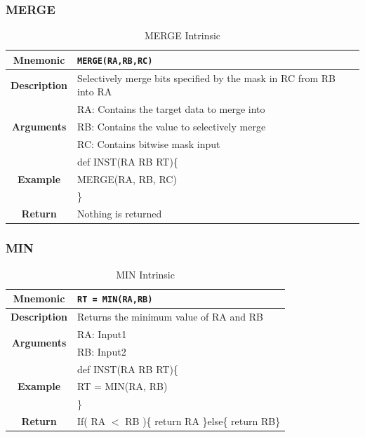 \documentclass{article}
\begin{document}
\clearpage
\subsubsection{MERGE}
\label{sec:MERGE}

\begin{table}[h]
\begin{center}
\caption{MERGE Intrinsic}
\vspace{0.125in}
\label{tab:MERGEIntrinsic}
\begin{tabular}{|c|l|}
\hline
\textbf{Mnemonic} & \texttt{MERGE(RA,RB,RC)}\\
\hline
\textbf{Description} & Selectively merge bits specified by the mask in RC from RB into RA\\
\hline
\multirow{3}{*}{\textbf{Arguments}} & RA: Contains the target data to merge into\\
                          			     & RB: Contains the value to selectively merge\\
			     			     & RC: Contains bitwise mask input\\
\hline
\multirow{3}{*}{\textbf{Example}} & def INST(RA RB RT)\{\\
                          			  &   MERGE(RA, RB, RC)\\
                                                    & \}\\
\hline
\textbf{Return} & Nothing is returned\\                                                    
\hline
\end{tabular}
\end{center}
\end{table}

\clearpage
\subsubsection{MIN}
\label{sec:MIN}

\begin{table}[h]
\begin{center}
\caption{MIN Intrinsic}
\vspace{0.125in}
\label{tab:MINIntrinsic}
\begin{tabular}{|c|l|}
\hline
\textbf{Mnemonic} & \texttt{RT = MIN(RA,RB)}\\
\hline
\textbf{Description} & Returns the minimum value of RA and RB\\
\hline
\multirow{2}{*}{\textbf{Arguments}} & RA: Input1\\
                          			     & RB: Input2\\
\hline
\multirow{3}{*}{\textbf{Example}} & def INST(RA RB RT)\{\\
                          			  &   RT = MIN(RA, RB)\\
                                                    & \}\\
\hline
\textbf{Return} & If( RA $<$ RB )\{ return RA \}else\{ return RB\}\\                                                    
\hline
\end{tabular}
\end{center}
\end{table}
\end{document}
